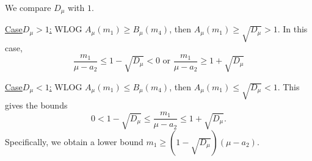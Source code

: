 \documentclass{article}
\theoremstyle{definition}
\theoremstyle{plain}
\theoremstyle{remark}
\newenvironment{acase}[1]{\par\underline{Case\space#1:}\space}{\par\smallskip}
\numberwithin{equation}{section}
\begin{document}
We compare $D_\mu$ with $1$.

\begin{acase}{$D_\mu > 1$}
  WLOG $A_\mu (m_1) \geq B_\mu (m_4)$, then $A_\mu (m_1) \geq \sqrt{D_\mu} > 1$.
  In this case,
  \[
    \frac{m_1}{\mu - a_2} \leq 1 - \sqrt{D_\mu} < 0 \text{ or } \frac{m_1}{\mu - a_2} \geq 1 + \sqrt{D_\mu}
  \]
\end{acase}

\begin{acase}{$D_\mu < 1$}
  WLOG $A_\mu (m_1) \leq B_\mu (m_4)$, then $A_\mu (m_1) \leq \sqrt{D_\mu} < 1$.
  This gives the bounds
  \[
    0 < 1 - \sqrt{D_\mu} \leq \frac{m_1}{\mu - a_2} \leq 1 + \sqrt{D_\mu}.
  \]
  Specifically, we obtain a lower bound $m_1 \geq (1 - \sqrt{D_\mu}) (\mu - a_2)$.
\end{acase}
\end{document}
